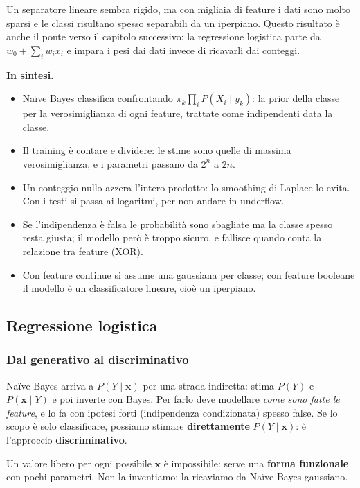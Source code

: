 \documentclass[12pt]{extarticle}
\begin{document}
\noindent Un separatore lineare sembra rigido, ma con migliaia di feature i dati sono molto sparsi e le classi risultano spesso separabili da un iperpiano. Questo risultato è anche il ponte verso il capitolo successivo: la regressione logistica parte da $w_0+\sum_i w_i x_i$ e impara i pesi dai dati invece di ricavarli dai conteggi.

\noindent\textbf{In sintesi.}
\begin{itemize}
    \item Naïve Bayes classifica confrontando $\pi_k\prod_i P(X_i\mid y_k)$: la prior della classe per la verosimiglianza di ogni feature, trattate come indipendenti data la classe.
    \item Il training è contare e dividere: le stime sono quelle di massima verosimiglianza, e i parametri passano da $2^n$ a $2n$.
    \item Un conteggio nullo azzera l'intero prodotto: lo smoothing di Laplace lo evita. Con i testi si passa ai logaritmi, per non andare in underflow.
    \item Se l'indipendenza è falsa le probabilità sono sbagliate ma la classe spesso resta giusta; il modello però è troppo sicuro, e fallisce quando conta la relazione tra feature (XOR).
    \item Con feature continue si assume una gaussiana per classe; con feature booleane il modello è un classificatore lineare, cioè un iperpiano.
\end{itemize}

\subsection{Regressione logistica}

\subsubsection{Dal generativo al discriminativo}

\noindent Naïve Bayes arriva a $P(Y\mid\mathbf{x})$ per una strada indiretta: stima $P(Y)$ e $P(\mathbf{x}\mid Y)$ e poi inverte con Bayes. Per farlo deve modellare \emph{come sono fatte le feature}, e lo fa con ipotesi forti (indipendenza condizionata) spesso false. Se lo scopo è solo classificare, possiamo stimare \textbf{direttamente} $P(Y\mid\mathbf{x})$: è l'approccio \textbf{discriminativo}.

\noindent Un valore libero per ogni possibile $\mathbf{x}$ è impossibile: serve una \textbf{forma funzionale} con pochi parametri. Non la inventiamo: la ricaviamo da Naïve Bayes gaussiano.
\end{document}
